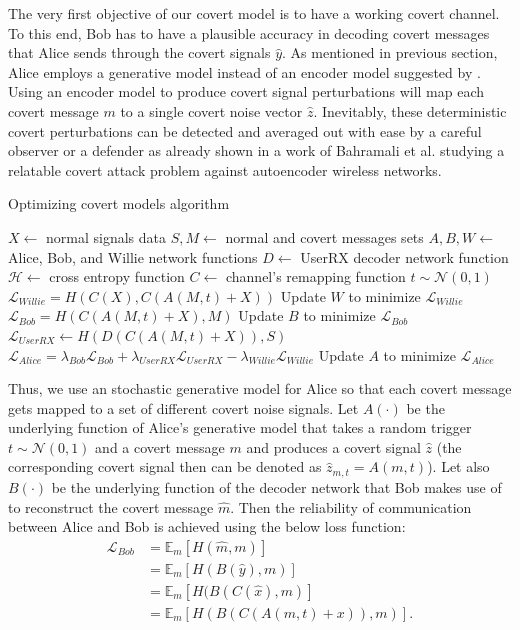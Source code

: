 The very first objective of our covert model is to have a working covert channel. To this end, Bob has to have a plausible accuracy in decoding covert messages that Alice sends through the covert signals \(\hat{y}\). As mentioned in previous section, Alice employs a generative model instead of an encoder model suggested by \cite{mohammed2021adversarial}. Using an encoder model to produce covert signal perturbations will map each covert message \(m\) to a single covert noise vector \(\hat{z}\). Inevitably, these deterministic covert perturbations can be detected and averaged out with ease by a careful observer or a defender as already shown in a work of Bahramali et al. \cite{bahramali2021robust} studying a relatable covert attack problem against autoencoder wireless networks.
\begin{algorithm}[tp!]
	\caption{Optimizing covert models algorithm}\label{alg:cap}
	\small
	\begin{algorithmic}
		\State $X \gets$ normal signals data
		\State $S, M \gets$ normal and covert messages sets
		\State $A, B, W \gets$ Alice, Bob, and Willie network functions
		\State $D \gets$ UserRX decoder network function
		\State $\mathcal{H} \gets$ cross entropy function
		\State $C \gets$ channel's remapping function
			\State $t \sim \mathcal{N}(0, 1)$
			\State $\mathcal{L}_{Willie} = H(C(X), C(A(M, t) + X))$
			\State Update $W$ to minimize $\mathcal{L}_{Willie}$
			\State $\mathcal{L}_{Bob} = H(C(A(M, t) + X), M)$
			\State Update $B$ to minimize $\mathcal{L}_{Bob}$
			\State $\mathcal{L}_{UserRX} \gets H(D(C(A(M, t) + X)), S)$
			\State
			$\mathcal{L}_{Alice} = \lambda_{Bob} \mathcal{L}_{Bob} + \lambda_{UserRX} \mathcal{L}_{UserRX} - \lambda_{Willie} \mathcal{L}_{Willie}$
			\State Update $A$ to minimize $\mathcal{L}_{Alice}$
		\EndFor
	\end{algorithmic}
\end{algorithm}
Thus, we use an stochastic generative model for Alice so that each covert message gets mapped to a set of different covert noise signals. Let \(A(\cdot)\) be the underlying function of Alice's generative model that takes a random trigger \(t \sim \mathcal{N}(0, 1)\) and a covert message \(m\) and produces a covert signal \(\hat{z}\) (the corresponding covert signal then can be denoted as \(\hat{z}_{m, t} = A(m, t)\)). Let also  \(B(\cdot)\) be the underlying function of the decoder network that Bob makes use of to reconstruct the covert message \(\hat{m}\). Then the reliability of communication between Alice and Bob is achieved using the below loss function:
\begin{equation}
	\begin{aligned} \label{bob_loss}
	\mathcal{L}_{Bob} & = \mathbb{E}_{m}[H(\hat{m}, m)] \\
	& = \mathbb{E}_{m}[H(B(\hat{y}), m)] \\ 
	& = \mathbb{E}_{m}[H(B(C(\hat{x}), m)] \\ 
	& = \mathbb{E}_{m}[H(B(C(A(m, t) + x)), m)].
	\end{aligned}
\end{equation}


